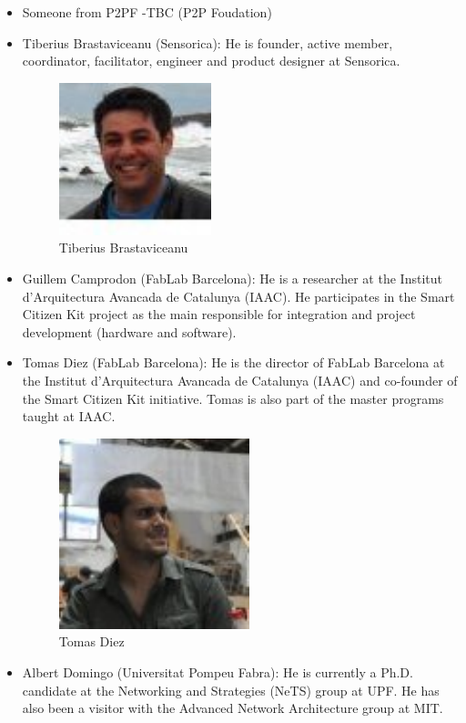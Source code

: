 \documentclass[oneside]{book}   %
\begin{document}
\begin{itemize}
\item Someone from P2PF -TBC (P2P Foudation)
\item Tiberius Brastaviceanu (Sensorica): He is founder, active member, coordinator, facilitator, engineer and product designer at Sensorica.
\begin{figure}
\begin{center}
\includegraphics[width=0.125\linewidth]{Tiberius}
\caption{Tiberius Brastaviceanu}
\end{center}
\end{figure}
\item Guillem Camprodon (FabLab Barcelona): He is a researcher at the Institut d'Arquitectura Avancada de Catalunya (IAAC). He participates in the Smart Citizen Kit project as the main responsible for integration and project development (hardware and software).
\item Tomas Diez (FabLab Barcelona): He is the director of FabLab Barcelona at the Institut d'Arquitectura Avancada de Catalunya (IAAC) and co-founder of the Smart Citizen Kit initiative. Tomas is also part of the master programs taught at IAAC.
\begin{figure}
\begin{center}
\includegraphics[width=0.125\linewidth]{tomas}
\caption{Tomas Diez}
\end{center}
\end{figure}
\item Albert Domingo (Universitat Pompeu Fabra):
He is currently a Ph.D. candidate at the Networking and Strategies (NeTS) group at UPF. He has also been a visitor with the Advanced Network Architecture group at MIT.


\end{itemize}
\end{document}
